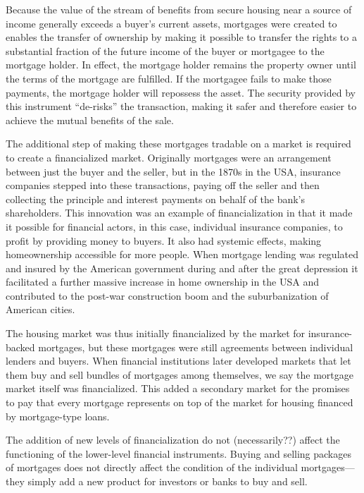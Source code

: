 Because the value of the stream of benefits from secure housing near a source of income generally exceeds a buyer's current assets, mortgages were created to  enables the transfer of ownership by making it possible to transfer the rights to a substantial fraction of the future income of the buyer or mortgagee to the mortgage holder. In effect, the mortgage holder remains the property owner until the terms of the mortgage are fulfilled.  If the mortgagee fails to make those payments, the mortgage holder will repossess the asset. The security provided by this instrument ``de-risks'' the transaction, making it safer and therefore easier to achieve the mutual benefits of the sale. 

The additional step of making these mortgages tradable on a market is required to create a financialized market. Originally mortgages were an arrangement between just the buyer and the seller, but in the 1870s in the USA, insurance companies stepped into these transactions, paying off the seller and then collecting the principle and interest payments on behalf of the bank's shareholders. This innovation was an example of financialization in that it made it possible for financial actors, in this case, individual insurance companies, to profit by providing money to buyers. It also had systemic effects, making homeownership accessible for more people. When mortgage lending was regulated and insured  by the American government during and after the great depression it facilitated a further massive increase in home ownership in the USA and contributed to the post-war construction boom and the suburbanization of American cities. 

The housing market was thus initially financialized by the market for insurance-backed mortgages, but these mortgages were still agreements between individual lenders and buyers. When financial institutions later developed markets that let them buy and sell bundles of mortgages among themselves, we say the mortgage market itself was financialized. This added %
a secondary market for the promises to pay that every mortgage represents on top of the market for housing financed by mortgage-type loans.
%

The addition of new levels of financialization do not (necessarily??) affect the functioning of the lower-level financial instruments. Buying and selling packages of mortgages does not directly affect the condition of the individual mortgages---they simply add a new product for investors or banks to buy and sell. 


